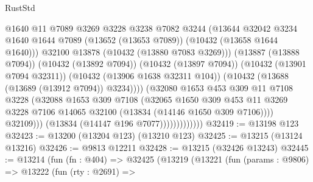 \begin{lexlean}{RustStd}
\begin{coremodule}
                                    @1640
                                    @11
                                    @7089
                                    @3269
                                    @3228
                                    @3238
                                    @7082
                                    @3244
                                    (@13644
                                      @32042
                                      @3234
                                      @1640
                                      @1644
                                      @7089
                                      (@13652 (@13653 @7089))
                                      (@10432 (@13658 @1644 @1640)))
                                    @32100
                                    @13878
                                    (@10432 (@13880 @7083 @3269)))
                                  (@13887 (@13888 @7094))
                                  (@10432 (@13892 @7094))
                                  (@10432 (@13897 @7094))
                                  (@10432 (@13901 @7094 @32311))
                                  (@10432 (@13906 @1638 @32311 @104))
                                  (@10432 (@13688 (@13689 (@13912 @7094)) @3234))))
                              (@32080
                                @1653
                                @453
                                @309
                                @11
                                @7108
                                @3228
                                (@32088
                                  @1653
                                  @309
                                  @7108
                                  (@32065
                                    @1650
                                    @309
                                    @453
                                    @11
                                    @3269
                                    @3228
                                    @7106
                                    @14065
                                    @32100
                                    (@13834 (@14146 @1650 @309 @7106))))
                                @32109)))
                          (@13834 (@14147 @196 @7077)))))))))))))
@32419 := @13198 @123
@32423 := @13200 (@13204 @123) (@13210 @123)
@32425 := @13215 (@13124 @13216)
@32426 := @9813 @12211
@32428 := @13215 (@32426 @13243)
@32445 := @13214
    (fun (fn : @404) =>
    @32425
      (@13219
        (@13221
          (fun (params : @9806) =>
          @13222
            (fun (rty : @2691) =>

\end{coremodule}
\end{lexlean}

